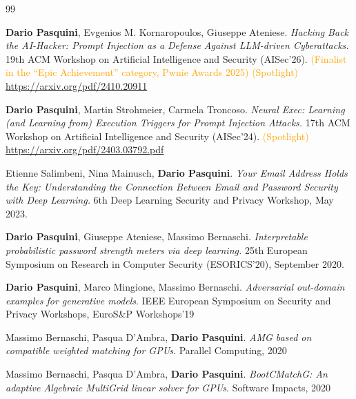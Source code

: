 \documentclass[10pt]{article} %
\begin{document}
\begin{thebibliography}{99}
\setcounter{enumiv}{7} 

	\textbf{Dario Pasquini},  Evgenios M. Kornaropoulos, Giuseppe Ateniese. \textit{Hacking Back the AI-Hacker: Prompt Injection as a Defense Against LLM-driven Cyberattacks.} 19th ACM Workshop on Artificial Intelligence and Security (AISec'26). \textcolor{orange}{(Finalist in the ``Epic Achievement'' category, Pwnie Awards 2025)} \textcolor{orange}{(Spotlight)}  \url{https://arxiv.org/pdf/2410.20911}
	

	\textbf{Dario Pasquini},  Martin Strohmeier, Carmela Troncoso. \textit{Neural Exec: Learning (and Learning from) Execution Triggers for Prompt Injection Attacks.} 17th ACM Workshop on Artificial Intelligence and Security (AISec'24). \textcolor{orange}{(Spotlight)} \url{https://arxiv.org/pdf/2403.03792.pdf}

	
	Etienne Salimbeni, Nina Mainusch, \textbf{Dario Pasquini}. \textit{Your Email Address Holds the Key: Understanding the Connection Between Email and Password Security with Deep Learning.} 6th Deep Learning Security and Privacy Workshop, May 2023.

\textbf{Dario Pasquini}, Giuseppe Ateniese, Massimo Bernaschi. \textit{Interpretable probabilistic password strength meters via deep learning.}  25th European Symposium on Research in Computer Security (\mbox{ESORICS}'20), September 2020. 

  \textbf{Dario Pasquini}, Marco Mingione,  Massimo Bernaschi. \textit{Adversarial out-domain examples for generative models}. IEEE European Symposium on Security and Privacy Workshops, EuroS\&P Workshops'19

Massimo Bernaschi, Pasqua D’Ambra,  \textbf{Dario Pasquini}.\textit{ AMG based on compatible weighted matching for GPUs}. Parallel Computing, 2020

 Massimo Bernaschi, Pasqua D’Ambra,  \textbf{Dario Pasquini}.\textit{ BootCMatchG: An adaptive Algebraic MultiGrid linear solver for GPUs}. Software Impacts, 2020
\end{thebibliography}
\end{document}
